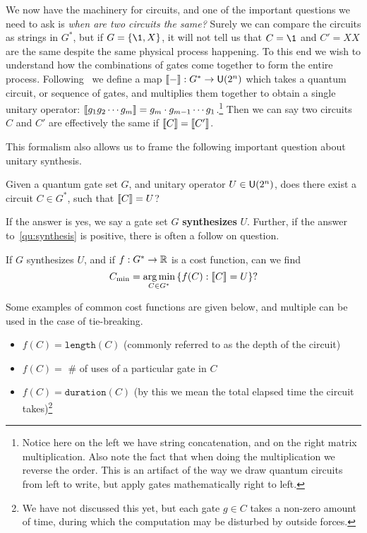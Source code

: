 We now have the machinery for circuits, and one of the important questions we need to ask is \emph{when are two circuits the same?}
Surely we can compare the circuits as strings in $G^*$, but if $G = \qty{\1, X}$, it will not tell us that $C = \1$ and $C' = XX$ are the same despite the same physical process happening.
To this end we wish to understand how the combinations of gates come together to form the entire process.
Following~\cite{formalcircuit} we define a map $\llbracket-\rrbracket: G^* \to \mathsf{U} (2^n)$ which takes a quantum circuit, or sequence of gates, and multiplies them together to obtain a single unitary operator: $\llbracket g_1g_2\cdots g_m\rrbracket = g_m\cdot g_{m-1} \cdots g_1$.\footnote{Notice here on the left we have string concatenation, and on the right matrix multiplication. Also note the fact that when doing the multiplication we reverse the order. This is an artifact of the way we draw quantum circuits from left to write, but apply gates mathematically right to left.}
Then we can say two circuits $C$ and $C'$ are effectively the same if $\llbracket C\rrbracket = \llbracket C'\rrbracket$.

This formalism also allows us to frame the following important question about unitary synthesis.
\begin{question}\label{qu:synthesis}
    Given a quantum gate set $G$, and unitary operator $U\in\mathsf{U} (2^n)$, does there exist a circuit $C\in G^*$, such that $\llbracket C\rrbracket = U$?
\end{question}
If the answer is yes, we say a gate set $G$ \textbf{synthesizes} $U$.
Further, if the answer to~\ref{qu:synthesis} is positive, there is often a follow on question.
\begin{question}\label{qu:optimalsynthesis}
    If $G$ synthesizes $U$, and if $f: G^* \to \mathbb{R}$ is a cost function, can we find
    \begin{equation*}
        C_\text{min} = \operatorname*{arg\,min}_{C\in G^*} \qty{f(C) : \llbracket C\rrbracket = U}?
    \end{equation*}
\end{question}
Some examples of common cost functions are given below, and multiple can be used in the case of tie-breaking.
\begin{itemize}
    \item $f(C) = \mathtt{length}(C)$ (commonly referred to as the depth of the circuit)
    \item $f(C) = $ \# of uses of a particular gate in $C$
    \item $f(C) = \mathtt{duration}(C)$ (by this we mean the total elapsed time the circuit takes)\footnote{We have not discussed this yet, but each gate $g\in C$ takes a non-zero amount of time, during which the computation may be disturbed by outside forces.}
\end{itemize}

